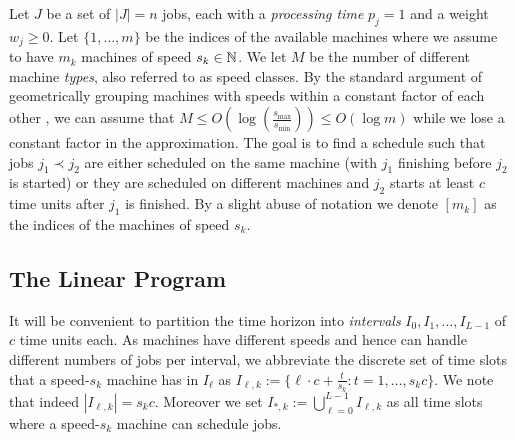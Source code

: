   Let $J$ be a  set of $|J| = n$ jobs, each with a \emph{processing time} $p_j = 1$ and a weight $w_j \geq 0$.
  Let $\{1,\ldots,m\}$ be the indices of the available machines where we assume to have
  $m_k$ machines of speed $s_k \in \mathbb{N}$. We let $M$ be the number of different machine {\em types}, also referred to as speed classes.  
  By the standard argument of geometrically grouping machines with speeds within a constant factor of each other \cite{li2020scheduling, MRSSV}, we can assume that $M \leq O(\log (\frac{s_{\text{max}}}{s_{\text{min}}})) \leq O(\log m)$ while we lose a constant factor in the approximation.
  The goal is to find a schedule such that jobs $j_1 \prec j_2$ are either scheduled on the same machine (with $j_1$ finishing before $j_2$ is started) or they are scheduled on different machines and $j_2$ starts at least $c$ time units after $j_1$ is finished. By a slight abuse of notation we denote $[m_k]$ as the indices of the machines of speed $s_k$.
  
  
  \subsection{The Linear Program}
  
  
  It will be convenient to partition the time horizon into \emph{intervals} $I_0,I_1,\ldots,I_{L-1}$ of  $c$ time units each.
  As machines have different speeds and hence can handle different numbers of jobs per interval,
  we abbreviate the discrete set of time slots that a speed-$s_k$ machine has in $I_{\ell}$ as $I_{\ell,k} := \{ \ell \cdot c + \frac{t}{s_k} : t=1,\ldots,s_k c\}$. We note that indeed  $|I_{\ell,k}| = s_kc$. Moreover we set $I_{*,k} := \bigcup_{\ell=0}^{L-1} I_{\ell,k}$ as all time slots where a speed-$s_k$ machine can schedule jobs.
  
